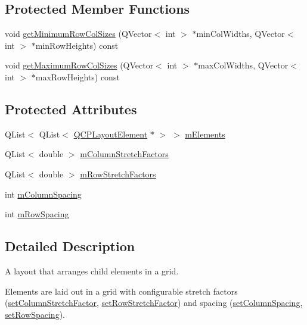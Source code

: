 \subsection*{Protected Member Functions}
\begin{DoxyCompactItemize}
\item 
void \hyperlink{class_q_c_p_layout_grid_ac645fb9b1c4257b08a9f09dee10b9b3f}{get\-Minimum\-Row\-Col\-Sizes} (Q\-Vector$<$ int $>$ $\ast$min\-Col\-Widths, Q\-Vector$<$ int $>$ $\ast$min\-Row\-Heights) const 
\item 
void \hyperlink{class_q_c_p_layout_grid_af348d903e3b8bc416f1fe1b8125d1173}{get\-Maximum\-Row\-Col\-Sizes} (Q\-Vector$<$ int $>$ $\ast$max\-Col\-Widths, Q\-Vector$<$ int $>$ $\ast$max\-Row\-Heights) const 
\end{DoxyCompactItemize}
\subsection*{Protected Attributes}
\begin{DoxyCompactItemize}
\item 
Q\-List$<$ Q\-List$<$ \hyperlink{class_q_c_p_layout_element}{Q\-C\-P\-Layout\-Element} $\ast$ $>$ $>$ \hyperlink{class_q_c_p_layout_grid_a3577d3855bf8ad20ef9079291a49f397}{m\-Elements}
\item 
Q\-List$<$ double $>$ \hyperlink{class_q_c_p_layout_grid_ac6aabe62339f94f18b9f8adab94b1840}{m\-Column\-Stretch\-Factors}
\item 
Q\-List$<$ double $>$ \hyperlink{class_q_c_p_layout_grid_a36c85a7eaf342680fb9b8a4977486f16}{m\-Row\-Stretch\-Factors}
\item 
int \hyperlink{class_q_c_p_layout_grid_ae9ac48f0791be07ead0a96dbd5622770}{m\-Column\-Spacing}
\item 
int \hyperlink{class_q_c_p_layout_grid_a8b67f183f4645739cc4c794d75843b40}{m\-Row\-Spacing}
\end{DoxyCompactItemize}


\subsection{Detailed Description}
A layout that arranges child elements in a grid. 

Elements are laid out in a grid with configurable stretch factors (\hyperlink{class_q_c_p_layout_grid_ae38f31a71687b9d7ee3104852528fb50}{set\-Column\-Stretch\-Factor}, \hyperlink{class_q_c_p_layout_grid_a7b0273de5369bd93d942edbaf5b166ec}{set\-Row\-Stretch\-Factor}) and spacing (\hyperlink{class_q_c_p_layout_grid_a3a49272aba32bb0fddc3bb2a45a3dba0}{set\-Column\-Spacing}, \hyperlink{class_q_c_p_layout_grid_aaef2cd2d456197ee06a208793678e436}{set\-Row\-Spacing}).

